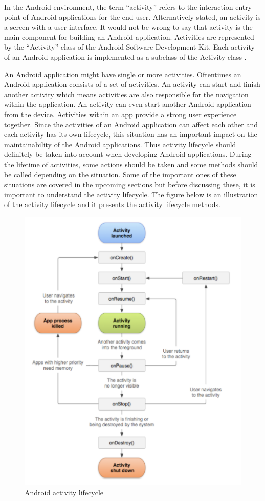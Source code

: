 In the Android environment, the term “activity” refers to the interaction entry point of Android applications for the end-user. Alternatively stated, an activity is a screen with a user interface. It would not be wrong to say that activity is the main component for building an Android application. Activities are represented by the “Activity” class of the Android Software Development Kit. Each activity of an Android application is implemented as a subclass of the Activity class \cite{9}. 

An Android application might have single or more activities. Oftentimes an Android application consists of a set of activities. An activity can start and finish another activity which means activities are also responsible for the navigation within the application. An activity can even start another Android application from the device. Activities within an app provide a strong user experience together. Since the activities of an Android application can affect each other and each activity has its own lifecycle, this situation has an important impact on the maintainability of the Android applications. Thus activity lifecycle should definitely be taken into account when developing Android applications. During the lifetime of activities, some actions should be taken and some methods should be called depending on the situation. Some of the important ones of these situations are covered in the upcoming sections but before discussing these, it is important to understand the activity lifecycle. The figure below is an illustration of the activity lifecycle and it presents the activity lifecycle methods. 

\begin{figure}[ht!]
    \centering
    \includegraphics[scale=0.7]{figures/activity_lifecycle.png}
    \caption{Android activity lifecycle \protect\cite{9}}
    \label{fig:android_activity_life_cycle}
\end{figure}

